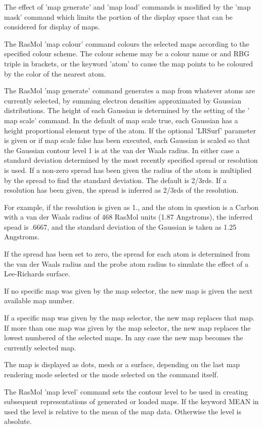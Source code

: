 The effect of
'map generate'
and
'map load'
commands is modified by the
'map mask'
command which limits the portion of the display space
that can be considered for display of maps.

The RasMol
'map colour'
command colours the selected maps according to the specified
colour scheme.  The colour scheme may be a colour name or
and RBG triple in brackets, or the keyword
'atom'
to cause the map points to be coloured by the color of the
nearest atom.

The RasMol
'map generate'
command generates a map from whatever atoms are currently selected,
by summing electron densities approximated by Gaussian distributions.
The height of each Gaussian is determined by the setting of the
' map scale'
command.
In the default of map scale true, each Gaussian has a height proportional
element type of the atom.
If the optional 'LRSurf' parameter is given or if map scale false
has been executed, each Gaussian is scaled so that
the Gaussian contour level 1 is at the van der Waals radius.
In either case a standard deviation determined by the
most recently specified spread or resolution is used.  If a non-zero spread has been
given the radius of the atom is multiplied by the spread to find the
standard deviation.  The default is 2/3rds.  If a resolution
has been given, the spread is inferred as 2/3rds of the resolution.

For example, if the resolution is given as 1., and the atom in question
is a Carbon with a van der Waals radius of 468 RasMol units (1.87 Angstroms),
the inferred spead is .6667, and the standard deviation of the Gaussian
is taken as 1.25 Angstroms.

If the spread has been set to zero, the spread for each atom is determined
from the van der Waals radius and the probe atom radius to simulate the
effect of a Lee-Richards surface.

If no specific map was given by the map selector, the new map is
given the next available map number.

If a specific map was given by the map selector, the new map replaces
that map.  If more than one map was given by the map selector, the
new map replaces the lowest numbered of the selected maps.  In any
case the new map becomes the currently selected map.

The map is displayed as dots, mesh or a surface, depending on the last
map rendering mode selected or the mode selected on the command itself.

The RasMol
'map level'
command sets the contour level to be used in creating subsequent
representations of generated or loaded maps.  If the keyword MEAN
in used the level is relative to the mean of the map data.  Otherwise
the level is absolute.

